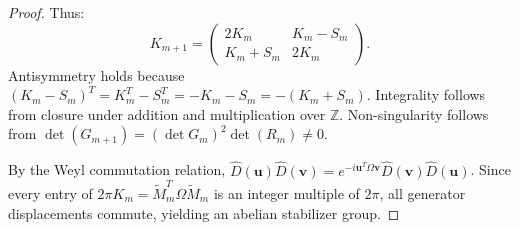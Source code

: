 \documentclass[10pt,a4paper]{amsart}
\newcommand{\bvec}[1]{\boldsymbol{#1}}
\newcommand{\symp}{\Omega}
\begin{document}
\begin{proof}
Thus:
\begin{equation}\label{eq:k-recursive}
K_{m+1} = \begin{pmatrix} 2K_m & K_m - S_m \\ K_m + S_m & 2K_m \end{pmatrix}.
\end{equation}
Antisymmetry holds because $(K_m - S_m)^T = K_m^T - S_m^T = -K_m - S_m = -(K_m + S_m)$. Integrality follows from closure under addition and multiplication over $\mathbb{Z}$. Non-singularity follows from $\det(G_{m+1}) = (\det G_m)^2 \det(R_m) \neq 0$.

By the Weyl commutation relation, $\hat{D}(\bvec{u})\hat{D}(\bvec{v}) = e^{-i \bvec{u}^T \symp \bvec{v}} \hat{D}(\bvec{v})\hat{D}(\bvec{u})$. Since every entry of $2\pi K_m = \tilde{M}_m^T \symp \tilde{M}_m$ is an integer multiple of $2\pi$, all generator displacements commute, yielding an abelian stabilizer group.
\end{proof}
\end{document}
